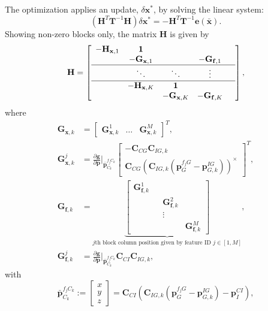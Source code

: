 \documentclass[letterpaper, 10 pt, conference]{ieeeconf}  %
\def\Vec#1{\mathbf{#1}}
\newcommand{\bbm}{\begin{bmatrix}}
\newcommand{\ebm}{\end{bmatrix}}
\newcommand{\pd}[2]{\frac{\partial #1}{\partial #2}}
\begin{document}
The optimization applies an update, $ \delta \Vec{x}^*$, by solving the linear system:
\begin{equation}
\label{eqn:gnOpt}
(\Vec H^T \Vec T ^{-1} \Vec H ) \delta \Vec{x}^*  = - \Vec{H}^T\Vec{T}^{-1}\Vec{e}(\bar{\Vec{x}}).
\end{equation}
Showing non-zero blocks only, the matrix $\Vec{H}$ is given by
\begin{equation}
\mathbf{H} = \left[\begin{array}{cccccc}
 -\Vec H_{\Vec x, 1} & \Vec 1 & & &   \\ 
 & -\Vec G_{\Vec x, 1} &  &   -\Vec G_{\Vec f, 1} \\ \hline
 & \ddots & \ddots & \vdots  \\  \hline
 & -\Vec H_{\Vec x, K} & \Vec 1 & \\ 
 & & -\Vec G_{\Vec x, K} &  -\Vec G_{\Vec f, K}   \\  
\end{array}\right], 
\end{equation}
where
\begin{align}
\Vec G_{\Vec x, k} &= \bbm \Vec G_{\Vec x, k}^1 & \hdots & \Vec G_{\Vec x, k}^M \ebm ^T,
\\[0.5em]
\Vec G_{\Vec{x}, k}^j &= \pd{\Vec g}{ \Vec p}\Bigr|_{\bar{\Vec p}_{C_k}^{f_j C_k}}
    \bbm -\Vec C_{CG} \Vec C_{IG,k} \\[0.5em] \Vec C_{CG} (\Vec C_{IG,k} (\Vec{p}_G^{f_j G} - \Vec p_{G,k}^{IG} ) )^\times  \ebm ^T,
\\[0.5em]
\Vec G_{\Vec f, k} &= \underbrace{\bbm \Vec G_{\Vec f, k}^1 & & \\ & & \Vec G_{\Vec f, k}^2 & \\ & & \vdots &  \\ & & & \Vec G_{\Vec f, k}^M \ebm}_{\text{$j$th block column position given by feature ID $j\in[1,M]$}}, \\[0.5em]
\Vec G_{\Vec f, k}^j &= \pd{\Vec g}{ \Vec p}\Bigr|_{\bar{\Vec p}_{C_k}^{f_j C_k}} \Vec C_{CI} \Vec C_{IG,k},
\end{align}
with
\begin{equation}
\bar{\Vec p}_{C_k}^{f_j C_k} := \bbm x \\ y \\ z \ebm = \Vec C_{CI} \left( \Vec C_{IG,k} (\Vec{p}_G^{f_j G} - \Vec{p}_{G,k}^{IG} )   - \Vec p_I^{CI} \right),
\end{equation}
\end{document}
